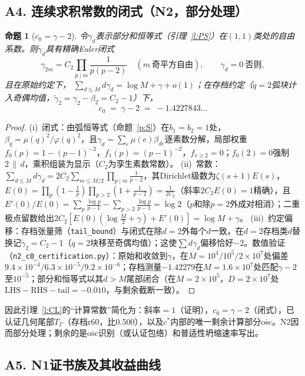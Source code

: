 \documentclass[11pt]{article}
\numberwithin{equation}{section}
\newtheorem{proposition}[theorem]{命题}
\theoremstyle{definition}
\theoremstyle{remark}
\begin{document}
\subsection*{A4. 连续求积常数的闭式（N2，部分处理）}

\begin{proposition}[$c_0=\gamma-2$]\label{p:c0}
令$\gamma_d$表示部分和恒等式（引理~\ref{l:PS}）在$(1,1)$类处的自由系数。则$\gamma_d$具有精确Euler闭式
\[
\gamma_{2m}=C_2\prod_{p\mid m}\frac1{p(p-2)}
\quad(m\ \text{奇平方自由}),\qquad
\gamma_d=0\ \text{否则},
\]
且在原始约定下，
$\sum_{d\le M}d\gamma_d=\log M+\gamma+o(1)$；在存档约定（$q=2$弧块计入奇偶均值，$\widetilde\gamma_2=\gamma_2-\beta_2=C_2-1$）下，
\[
c_0\;=\;\gamma-2\;=\;-1.4227843\ldots
\]
\end{proposition}

\begin{proof}
(i)~闭式：由弧恒等式（命题~\ref{p:S}）在$b_1=b_2=1$处，$\beta_q=\mu(q)^2/\varphi(q)^2$，且$\gamma_d=\sum_e\mu(e)\beta_{de}$逐素数分解，局部权重$f_0(p)=1-(p-1)^{-2}$，$f_1(p)=(p-1)^{-2}$，$f_{v\ge2}=0$；$f_0(2)=0$强制$2\,\|\,d$，乘积组装为显示（$C_2$为孪生素数常数）。
(ii)~常数：$\sum_{d\le M}d\gamma_d =2C_2\sum_{m\le M/2}\prod_{p\mid m}\tfrac1{p-2}$，其Dirichlet级数为$\zeta(s+1)E(s)$，$E(0)=\prod_p(1-\tfrac1p)\prod_{p>2}(1+\tfrac1{p-2}) =\tfrac1{2C_2}$（斜率$2C_2E(0)=1$精确），且$E'(0)/E(0)=\sum_p\tfrac{\log p}{p-1} -\sum_{p>2}\tfrac{\log p}{p-1}=\log2$（$p$和除$p=2$外成对相消）；二重极点留数给出$2C_2[E(0)(\log\tfrac M2+\gamma)+E'(0)]=\log M+\gamma$。
(iii)~约定偏移：存档张量筛（\texttt{tail\_bound}）与闭式在除$d=2$外每个$d$一致，在$d=2$存档类$d$替换记$\widetilde\gamma_2=C_2-1$（$q=2$块移至奇偶均值）；这使$\sum d\gamma_d$偏移恰好$-2$。数值验证（\texttt{n2\_c0\_certification.py}）：原始和收敛到$\gamma$，在$M=10^4/10^5/2\times10^7$处偏差$9.4\times10^{-4}/6.3\times10^{-5}/9.2\times10^{-6}$；存档测量$-1.42279$在$M=1.6\times10^{7}$处匹配$\gamma-2$至$10^{-5}$；部分和恒等式以其$d>M$尾部闭合（在$M=2\times10^5$，$D=2\times10^{7}$处$\mathrm{LHS}-\mathrm{RHS}-\mathrm{tail}=-0.010$，与剩余截断一致）。
\end{proof}

\noindent 因此引理~\ref{l:CL}的“计算常数”简化为：斜率$=1$（证明），$c_0=\gamma-2$（闭式），已认证几何尾部$T_\Gamma$（存档r60，比$0.500$），以及$c^{*}$内部的唯一剩余计算部分$\overline{\mathrm{osc}}$。N2因而部分处理；剩余的是$\overline{\mathrm{osc}}$识别（或认证包络）和普适性坍缩速率写出。

\subsection*{A5. N1证书族及其收益曲线}
\end{document}
